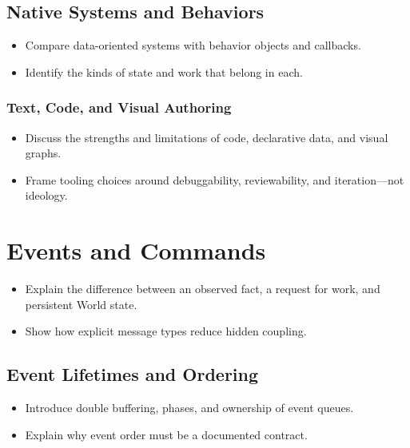 \documentclass[
  11pt,
  letterpaper,
  DIV=11,
  numbers=noendperiod,
  twoside,
  open=right]{scrreprt}
\providecommand{\tightlist}{%
  \setlength{\itemsep}{0pt}\setlength{\parskip}{0pt}}
\begin{document}
\subsection{Native Systems and
Behaviors}\label{native-systems-and-behaviors}

\begin{itemize}
\tightlist
\item
  Compare data-oriented systems with behavior objects and callbacks.
\item
  Identify the kinds of state and work that belong in each.
\end{itemize}

\subsubsection{Text, Code, and Visual
Authoring}\label{text-code-and-visual-authoring}

\begin{itemize}
\tightlist
\item
  Discuss the strengths and limitations of code, declarative data, and
  visual graphs.
\item
  Frame tooling choices around debuggability, reviewability, and
  iteration---not ideology.
\end{itemize}

\section{Events and Commands}\label{events-and-commands}

\begin{itemize}
\tightlist
\item
  Explain the difference between an observed fact, a request for work,
  and persistent World state.
\item
  Show how explicit message types reduce hidden coupling.
\end{itemize}

\subsection{Event Lifetimes and
Ordering}\label{event-lifetimes-and-ordering}

\begin{itemize}
\tightlist
\item
  Introduce double buffering, phases, and ownership of event queues.
\item
  Explain why event order must be a documented contract.
\end{itemize}
\end{document}
